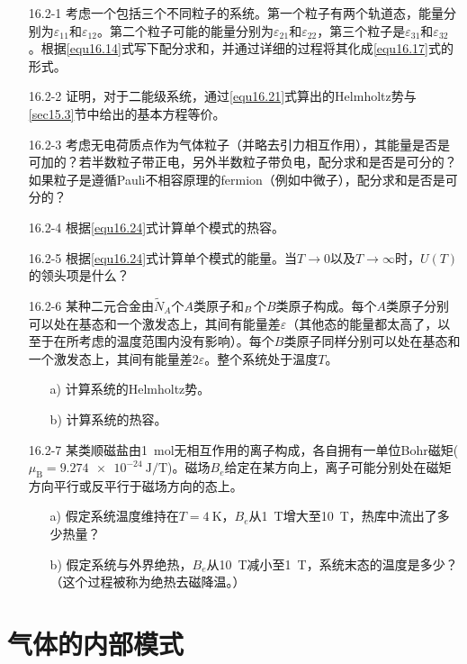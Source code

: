 \begin{itemize}
\item[16.2-1] 考虑一个包括三个不同粒子的系统。第一个粒子有两个轨道态，能量分别为$\varepsilon_{11}$和$\varepsilon_{12}$。第二个粒子可能的能量分别为$\varepsilon_{21}$和$\varepsilon_{22}$，第三个粒子是$\varepsilon_{31}$和$\varepsilon_{32}$。根据\eqref{equ16.14}式写下配分求和，并通过详细的过程将其化成\eqref{equ16.17}式的形式。
\item[16.2-2] 证明，对于二能级系统，通过\eqref{equ16.21}式算出的Helmholtz势与\ref{sec15.3}节中给出的基本方程等价。 
\item[16.2-3] 考虑无电荷质点作为气体粒子（并略去引力相互作用），其能量是否是可加的？若半数粒子带正电，另外半数粒子带负电，配分求和是否是可分的？如果粒子是遵循Pauli不相容原理的fermion（例如中微子），配分求和是否是可分的？
\item[16.2-4] 根据\eqref{equ16.24}式计算单个模式的热容。
\item[16.2-5] 根据\eqref{equ16.24}式计算单个模式的能量。当$T\rightarrow 0$以及$T\rightarrow \infty$时，$U(T)$的领头项是什么？
\item[16.2-6] 某种二元合金由$\tilde N_A$个$A$类原子和$\title N_B$个$B$类原子构成。每个$A$类原子分别可以处在基态和一个激发态上，其间有能量差$\varepsilon$（其他态的能量都太高了，以至于在所考虑的温度范围内没有影响）。每个$B$类原子同样分别可以处在基态和一个激发态上，其间有能量差$2\varepsilon$。整个系统处于温度$T$。
	\begin{itemize}
	\item[a)] 计算系统的Helmholtz势。
	\item[b)] 计算系统的热容。
	\end{itemize}
\item[16.2-7] 某类顺磁盐由\SI{1}{\mole}无相互作用的离子构成，各自拥有一单位Bohr磁矩($\mu_\text{B}=\SI{9.274e-24}{\joule\per\tesla}$)。磁场$B_e$给定在某方向上，离子可能分别处在磁矩方向平行或反平行于磁场方向的态上。
	\begin{itemize}
	\item[a)] 假定系统温度维持在$T=\SI{4}{\kelvin}$，$B_e$从\SI{1}{\tesla}增大至\SI{10}{\tesla}，热库中流出了多少热量？
	\item[b)] 假定系统与外界绝热，$B_e$从\SI{10}{\tesla}减小至\SI{1}{\tesla}，系统末态的温度是多少？（这个过程被称为绝热去磁降温。）
	\end{itemize}
\end{itemize}

\section{气体的内部模式}\label{sec16.3}